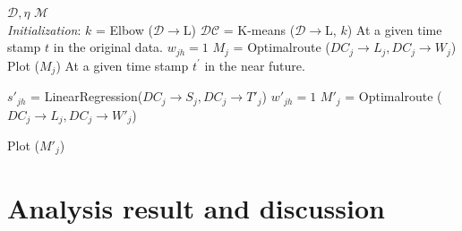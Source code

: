 \documentclass[conference,compsoc]{IEEEtran}
\begin{document}
\begin{algorithm}
	\caption{}
	\begin{algorithmic}[1]
		\renewcommand{\algorithmicrequire}{\textbf{Input:}}
		\renewcommand{\algorithmicensure}{\textbf{Output:}}
		\REQUIRE $\mathcal{D}, \eta$
		\ENSURE  $\mathcal{M}$
		\\ \textit{Initialization}: 
		\STATE $k$ = Elbow ($\mathcal{D}\rightarrow$L)
		\STATE $\mathcal{DC}$ = K-means ($\mathcal{D}\rightarrow$L, $k$)
		\STATE At a given time stamp $t$ in the original data.
		\STATE $w_{jh} = 1$
		\STATE $M_j$ = Optimalroute ($DC_j \rightarrow L_j, DC_j \rightarrow W_j$)
		\ENDIF
		\ENDFOR
		\STATE Plot ($M_j$)
		\ENDFOR
	\STATE At a given time stamp $t^{'}$ in the near future.

\STATE $s'_{jh}$ = LinearRegression($DC_j \rightarrow S_j, DC_j \rightarrow T'_j$)
\STATE $w'_{jh} = 1$
\STATE $M'_j$ = Optimalroute ($DC_j \rightarrow L_j, DC_j \rightarrow W'_j$)
\ENDIF

\ENDFOR
\STATE Plot ($M'_j$)
\ENDFOR

	\end{algorithmic} 
\label{algorithm1}
\end{algorithm}


\section{Analysis result and discussion}
%
%
 
\end{document}
